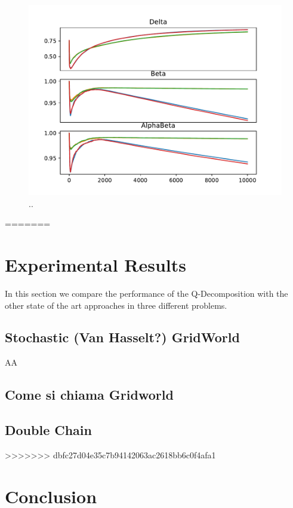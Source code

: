 \documentclass[conference]{IEEEtran}
\begin{document}
\begin{figure}[t]
 \begin{minipage}{\columnwidth}
 \centering
  \includegraphics[width=\textwidth]{./imgs/gridHasselt/lrs.pdf}
 \end{minipage}
  \caption{..}
  \label{F:hasselt_all}
\end{figure}
=======

\section{Experimental Results}
In this section we compare the performance of the Q-Decomposition with the other state of the art approaches in three different problems.
\subsection{Stochastic (Van Hasselt?) GridWorld}
AA
\subsection{Come si chiama Gridworld}

\subsection{Double Chain}
>>>>>>> dbfc27d04e35c7b94142063ac2618bb6c0f4afa1

\section{Conclusion}
\end{document}
